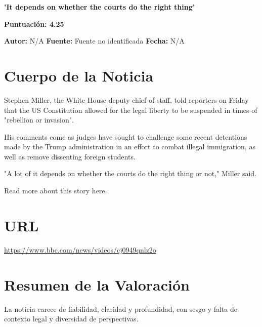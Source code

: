 \documentclass[10pt,a4paper]{article}
\begin{document}
\begin{center}
    {\Huge\bfseries 'It depends on whether the courts do the right thing'\par}
    \vspace{0.5em}
    {\large\bfseries Puntuación: 4.25\par}
\end{center}
\vspace{1em}

\noindent\textbf{Autor:} N/A \hfill \textbf{Fuente:} Fuente no identificada \hfill \textbf{Fecha:} N/A\par
\vspace{1em}

\section*{Cuerpo de la Noticia}
\setlength{\parskip}{1em}
\setlength{\parindent}{0em}
Stephen Miller, the White House deputy chief of staff, told reporters on Friday that the US Constitution allowed for the legal liberty to be suspended in times of "rebellion or invasion".
\par\medskip
His comments come as judges have sought to challenge some recent detentions made by the Trump administration in an effort to combat illegal immigration, as well as remove dissenting foreign students.
\par\medskip
"A lot of it depends on whether the courts do the right thing or not," Miller said.
\par\medskip
Read more about this story here.
\vspace{1em}

\section*{URL}
\url{ https://www.bbc.com/news/videos/cj0949qnlz2o }
\vspace{1em}

\section*{Resumen de la Valoración}
    La noticia carece de fiabilidad, claridad y profundidad, con sesgo y falta de contexto legal y diversidad de perspectivas.
\vspace{1em}
\end{document}
